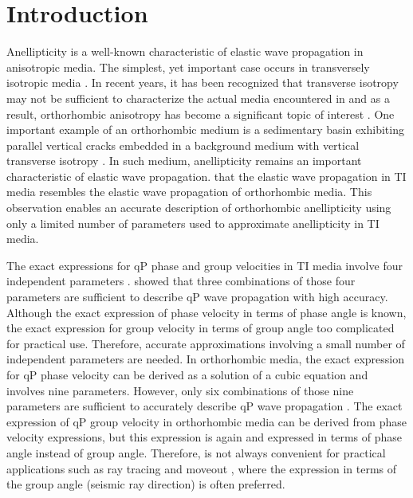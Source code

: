 \section{Introduction}

Anellipticity is a well-known characteristic of elastic wave propagation in anisotropic media. 
The simplest, yet  important case  occurs in transversely isotropic media  \cite[]{grechkabook,tsvankinbook,thomsenbook}.
In recent years, it has been recognized that transverse isotropy may not be sufficient to characterize the actual media encountered in   and as a result, orthorhombic anisotropy has become a significant topic of interest \cite[e.g.][]{tsvankinortho,tsvankinbook,bakulin2,xu,vascon,grechkabook,fowlerortho,thomsenbook}. 
One important example of an orthorhombic medium is a sedimentary basin exhibiting parallel vertical cracks embedded in a background medium 
with vertical transverse isotropy \cite[]{helbig,tsvankinortho,tsvankinbook,grechkabook}. 
In such  medium,  anellipticity remains an important characteristic of elastic wave propagation.\cite{tsvankinortho,tsvankinbook}  that the elastic wave propagation in TI media resembles the elastic wave propagation  of orthorhombic media. This observation enables an accurate description of orthorhombic anellipticity using only a limited number of parameters  used to approximate anellipticity in TI media.

The exact expressions for qP phase and group velocities in TI media involve four independent parameters \cite[]{gass,berryman}. 
\cite{alkatsvankin}  showed that three combinations of those four parameters are sufficient to describe qP wave propagation with high accuracy. Although the exact expression of phase velocity in terms of phase angle is known, the exact expression for group velocity 
in terms of group angle  too complicated for practical use. Therefore, accurate approximations involving a small number of independent parameters are needed. In orthorhombic media, the exact expression for qP phase velocity can be derived as a solution of a cubic equation and involves nine parameters. However, only six combinations of those nine parameters are sufficient to accurately describe qP wave propagation \cite[]{tsvankinortho,tsvankinbook}. The exact expression of qP group velocity in orthorhombic media can be derived from phase velocity expressions, but this expression is again  and  expressed in terms of  phase angle instead of group angle. 
Therefore,  is not always convenient for practical applications such as ray tracing and moveout  , where the expression in terms of the group angle (seismic ray direction) is often preferred. 

